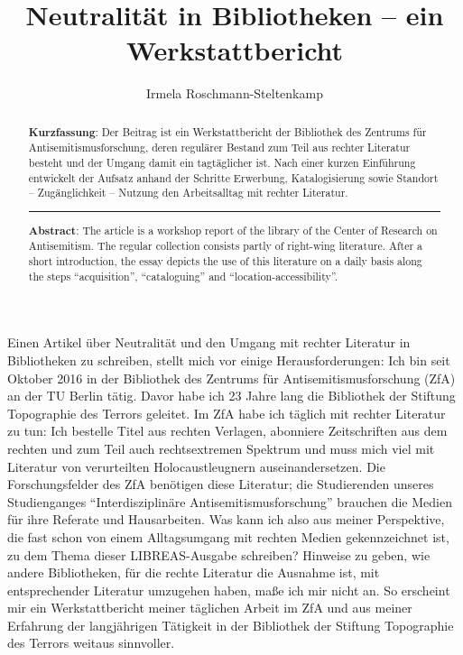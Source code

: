 \documentclass[a4paper,
fontsize=11pt,
oneside,
numbers=noperiodatend,
parskip=half-,
bibliography=totoc,
final
]{scrartcl}
\title{\LARGE{Neutralität in Bibliotheken -- ein Werkstattbericht}}%
\author{Irmela Roschmann-Steltenkamp} %
\date{}
\begin{document}
\maketitle
\thispagestyle{fancyplain} 

\begin{abstract}
\noindent \textbf{Kurzfassung}: Der Beitrag ist ein Werkstattbericht der
Bibliothek des Zentrums für Antisemitismusforschung, deren regulärer
Bestand zum Teil aus rechter Literatur besteht und der Umgang damit ein
tagtäglicher ist. Nach einer kurzen Einführung entwickelt der Aufsatz
anhand der Schritte Erwerbung, Katalogisierung sowie Standort --
Zugänglichkeit -- Nutzung den Arbeitsalltag mit rechter Literatur.

\begin{center}\rule{0.5\linewidth}{\linethickness}\end{center}

\noindent \textbf{Abstract}: The article is a workshop report of the library of
the Center of Research on Antisemitism. The regular collection consists
partly of right-wing literature. After a short introduction, the essay
depicts the use of this literature on a daily basis along the steps
``acquisition'', ``cataloguing'' and ``location-accessibility''.
\end{abstract}

Einen Artikel über Neutralität und den Umgang mit rechter Literatur in
Bibliotheken zu schreiben, stellt mich vor einige Herausforderungen: Ich
bin seit Oktober 2016 in der Bibliothek des Zentrums für
Antisemitismusforschung (ZfA) an der TU Berlin tätig. Davor habe ich 23
Jahre lang die Bibliothek der Stiftung Topographie des Terrors geleitet.
Im ZfA habe ich täglich mit rechter Literatur zu tun: Ich bestelle Titel
aus rechten Verlagen, abonniere Zeitschriften aus dem rechten und zum
Teil auch rechtsextremen Spektrum und muss mich viel mit Literatur von
verurteilten Holocaustleugnern auseinandersetzen. Die Forschungsfelder
des ZfA benötigen diese Literatur; die Studierenden unseres
Studienganges \enquote{Interdisziplinäre Antisemitismusforschung}
brauchen die Medien für ihre Referate und Hausarbeiten. Was kann ich
also aus meiner Perspektive, die fast schon von einem Alltagsumgang mit
rechten Medien gekennzeichnet ist, zu dem Thema dieser LIBREAS-Ausgabe
schreiben? Hinweise zu geben, wie andere Bibliotheken, für die rechte
Literatur die Ausnahme ist, mit entsprechender Literatur umzugehen
haben, maße ich mir nicht an. So erscheint mir ein Werkstattbericht
meiner täglichen Arbeit im ZfA und aus meiner Erfahrung der langjährigen
Tätigkeit in der Bibliothek der Stiftung Topographie des Terrors weitaus
sinnvoller.
\end{document}
